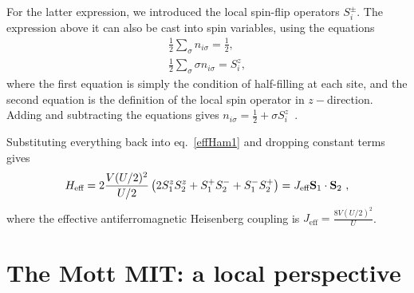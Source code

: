 \documentclass[reprint,hidelinks,onecolumn]{revtex4-2}
\begin{document}
For the latter expression, we introduced the local spin-flip operators \(S_i^\pm\). The expression above it can also be cast into spin variables, using the equations
\begin{equation}\begin{aligned}
	\frac{1}{2}\sum_{\sigma}n_{i\sigma} = \frac{1}{2},\\
    \frac{1}{2}\sum_{\sigma}\sigma n_{i\sigma} = S_i^z,
\end{aligned}\end{equation}
where the first equation is simply the condition of half-filling at each site, and the second equation is the definition of the local spin operator in \(z-\)direction. Adding and subtracting the equations gives \(n_{i\sigma} = \frac{1}{2} + \sigma S_i^z\)~.

Substituting everything back into eq.~\ref{effHam1} and dropping constant terms gives
\begin{equation}\begin{aligned}
	H_\text{eff} = 2\frac{V(U/2)^2}{U/2}\left(2S_1^z S_2^z + S_1^+S_2^- + S_1^-S_2^+\right) = J_\text{eff} {\bf S}_1\cdot{\bf S}_2~,
\end{aligned}\end{equation}
where the effective antiferromagnetic Heisenberg coupling is \(J_\text{eff} = \frac{8V(U/2)^2}{U}\).







\clearpage



\section{The Mott MIT: a local perspective}
\end{document}
